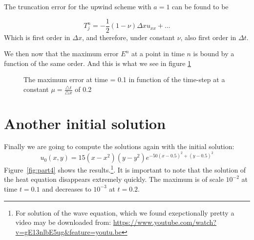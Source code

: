 The truncation error for the upwind scheme with $a=1$ can be found to be

\begin{equation}
T_j^n = -\frac{1}{2}(1-\nu)\Delta x u_{xx} + ...
\end{equation}
Which is first order in $\Delta x$, and therefore, under constant $\nu$, also first order in $\Delta t$.

We then now that the maximum error $E^n$ at a point in time $n$ is bound by a function of the same order. And this is what we see in figure \ref{errororrrTransport}

\begin{figure}[htbp] %
   \centering
    
   \caption{The maximum error at time = 0.1 in function of the time-step at a constant $\mu = \frac{\triangle t}{\triangle x}$ of 0.2}
   \label{errororrrTransport}
\end{figure}




\section{Another initial solution}
Finally we are going to compute the solutions again with the initial solution:
\begin{equation}
u_0(x,y) = 15(x-x^2)(y - y^2) e^{-50(x-0.5)^2 + (y-0.5)^2}
\end{equation}
Figure~\ref*{fig:part4} shows the results.\footnote{For solution of the wave equation, which we found exepctionally pretty a video may be downloaded from: \url{https://www.youtube.com/watch?v=gE13nlbE5ug&feature=youtu.be}}. It is important to note that the solution of the heat equation disappears extremely quickly. The maximum is of scale $10^{-2}$ at time $t = 0.1$ and decreases to $10^{-3}$ at $t=0.2$.

